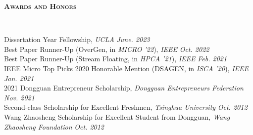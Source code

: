 \documentclass[a4paper]{article}
\newenvironment{changemargin}[2]{%
  \begin{list}{}{%
    \setlength{\topsep}{0pt}%
    \setlength{\leftmargin}{#1}%
    \setlength{\rightmargin}{#2}%
    \setlength{\listparindent}{\parindent}%
    \setlength{\itemindent}{\parindent}%
    \setlength{\parsep}{\parskip}%
  }%
  \item[]}{\end{list}
}
\newcommand{\lineover}{
	\begin{changemargin}{-0.05in}{-0.05in}
		\vspace*{-8pt}
		\hrulefill \\
		\vspace*{-2pt}
	\end{changemargin}
}
\newcommand{\header}[1]{
	\begin{changemargin}{-0.5in}{-0.5in}
		\scshape{\large \textbf{#1}}\\
  	\lineover
	\end{changemargin}
}
\newenvironment{body} {
	\vspace*{-16pt}
	\begin{changemargin}{-0.5in}{-0.5in}
  }	
	{\end{changemargin}
}
\begin{document}

\header{Awards and Honors}

\begin{body}
	\vspace{14pt}
	Dissertation Year Fellowship, \emph{UCLA} \hfill{} \emph{June. 2023}\\
	\smallskip
	Best Paper Runner-Up (OverGen, in \emph{MICRO '22}), \emph{IEEE} \hfill{} \emph{Oct. 2022}\\
	\smallskip
	Best Paper Runner-Up (Stream Floating, in \emph{HPCA '21}), \emph{IEEE} \hfill{} \emph{Feb. 2021}\\
	\smallskip
	IEEE Micro Top Picks 2020 Honorable Mention (DSAGEN, in \emph{ISCA '20}), \emph{IEEE} \hfill{} \emph{Jan. 2021}\\
	\smallskip
	2021 Dongguan Entrepreneur Scholarship, \emph{Dongguan Entrepreneurs Federation} \hfill{} \emph{Nov. 2021}\\
	\smallskip
	Second-class Scholarship for Excellent Freshmen, \emph{Tsinghua University} \hfill{} \emph{Oct. 2012}\\
	\smallskip
	Wang Zhaosheng Scholarship for Excellent Student from Dongguan, \emph{Wang Zhaosheng Foundation} \hfill{} \emph{Oct. 2012}\\
\end{body}

\smallskip
\smallskip


\end{document}
